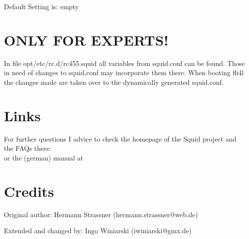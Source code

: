 \begin{description}
                Default Setting is: empty

\section{ONLY FOR EXPERTS!}

In file opt/etc/rc.d/rc455.squid all variables from squid.conf can be
found. Those in need of changes to squid.conf may incorporate them there.
When booting fli4l the changes made are taken over to the dynamically
generated squid.conf.

\section{Links}
For further questions I advice to check the homepage of the Squid project and
the FAQs there: \\
or the (german) manual at 

\section{Credits}
Original author: Hermann Strassner (hermann.strassner@web.de)

Extended and changed by: Ingo Winiarski (iwiniarski@gmx.de)
\end{description}
